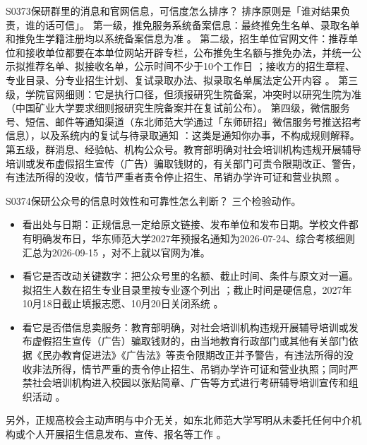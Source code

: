\begin{qa}{S0373}{保研群里的消息和官网信息，可信度怎么排序？}
排序原则是「谁对结果负责，谁的话可信」。
第一级，推免服务系统备案信息：最终推免生名单、录取名单和推免生学籍注册均以系统备案信息为准 。
第二级，招生单位官网文件：推荐单位和接收单位都要在本单位网站开辟专栏，公布推免生名额与推免办法，并统一公示拟推荐名单、拟接收名单，公示时间不少于10个工作日 ；接收方的招生章程、专业目录、分专业招生计划、复试录取办法、拟录取名单属法定公开内容 。
第三级，学院官网细则：它是执行口径，但须报研究生院备案，冲突时以研究生院为准（中国矿业大学要求细则报研究生院备案并在复试前公布）。
第四级，微信服务号、短信、邮件等通知渠道（东北师范大学通过「东师研招」微信服务号推送招考信息），以及系统内的复试与待录取通知 ：这类是通知你办事，不构成规则解释。
第五级，群消息、经验帖、机构公众号。教育部明确对社会培训机构违规开展辅导培训或发布虚假招生宣传（广告）骗取钱财的，有关部门可责令限期改正、警告，有违法所得的没收，情节严重者责令停止招生、吊销办学许可证和营业执照 。
\end{qa}

\begin{qa}{S0374}{保研公众号的信息时效性和可靠性怎么判断？}
三个检验动作。
\begin{itemize}
  \item 看出处与日期：正规信息一定给原文链接、发布单位和发布日期。学校文件都有明确发布日，华东师范大学2027年预报名通知为2026-07-24、综合考核细则汇总为2026-09-15 ，对不上就以官网为准。
  \item 看它是否改动关键数字：把公众号里的名额、截止时间、条件与原文对一遍。拟招生人数在招生专业目录里按专业逐个列出 ；截止时间是硬信息，2027年10月18日截止填报志愿、10月20日关闭系统 。
  \item 看它是否借信息卖服务：教育部明确，对社会培训机构违规开展辅导培训或发布虚假招生宣传（广告）骗取钱财的，由当地教育行政部门或其他有关部门依据《民办教育促进法》《广告法》等责令限期改正并予警告，有违法所得的没收非法所得，情节严重的责令停止招生、吊销办学许可证和营业执照；同时严禁社会培训机构进入校园以张贴简章、广告等方式进行考研辅导培训宣传和组织活动 。
\end{itemize}
另外，正规高校会主动声明与中介无关，如东北师范大学写明从未委托任何中介机构或个人开展招生信息发布、宣传、报名等工作 。
\end{qa}

